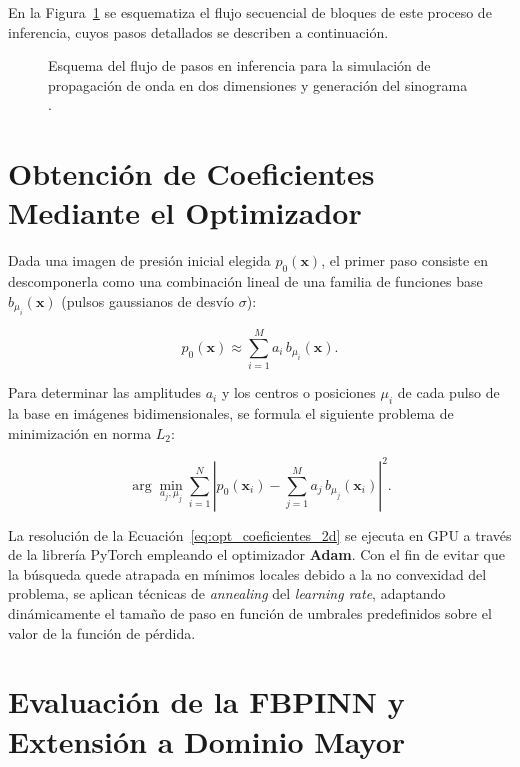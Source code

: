 En la Figura~\ref{fig:TOA_sin} se esquematiza el flujo secuencial de bloques de este proceso de inferencia, cuyos pasos detallados se describen a continuación.

\begin{figure}[H]
    \centering
    \resizebox{0.95\textwidth}{!}{%
    }%
    \caption{Esquema del flujo de pasos en inferencia para la simulación de propagación de onda en dos dimensiones y generación del sinograma \cite{DiLiscia2026}.}
    \label{fig:TOA_sin}
\end{figure}


\section{Obtención de Coeficientes Mediante el Optimizador}

Dada una imagen de presión inicial elegida $p_0(\mathbf{x})$, el primer paso consiste en descomponerla como una combinación lineal de una familia de funciones base $b_{\mu_i}(\mathbf{x})$ (pulsos gaussianos de desvío $\sigma$):

\begin{equation}
    p_0(\mathbf{x}) \approx \sum_{i=1}^M a_i \, b_{\mu_i}(\mathbf{x}).
    \label{eq:descomposicion_p0}
\end{equation}

Para determinar las amplitudes $a_i$ y los centros o posiciones $\mu_i$ de cada pulso de la base en imágenes bidimensionales, se formula el siguiente problema de minimización en norma $L_2$:

\begin{equation}
    \arg\min_{a_j, \mu_j} \sum_{i=1}^N \left| p_0(\mathbf{x}_i) - \sum_{j=1}^M a_j \, b_{\mu_j}(\mathbf{x}_i) \right|^2.
    \label{eq:opt_coeficientes_2d}
\end{equation}

La resolución de la Ecuación~\ref{eq:opt_coeficientes_2d} se ejecuta en GPU a través de la librería PyTorch empleando el optimizador \textbf{Adam}. Con el fin de evitar que la búsqueda quede atrapada en mínimos locales debido a la no convexidad del problema, se aplican técnicas de \textit{annealing} del \textit{learning rate}, adaptando dinámicamente el tamaño de paso en función de umbrales predefinidos sobre el valor de la función de pérdida.

\section{Evaluación de la FBPINN y Extensión a Dominio Mayor}

